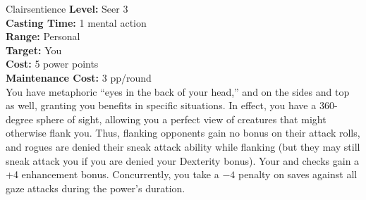 {Clairsentience}
{
	\textbf{Level:}
	Seer 3\\
	\textbf{Casting Time:}
	1 mental action\\
	\textbf{Range:}
	Personal\\
	\textbf{Target:}
	You\\
	\textbf{Cost:}
	5 power points\\
	\textbf{Maintenance Cost:}
	3 pp/round\\
}
{
	You have metaphoric ``eyes in the back of your head,'' and on the sides and top as well, granting you benefits in specific situations. In effect, you have a 360-degree sphere of sight, allowing you a perfect view of creatures that might otherwise flank you. Thus, flanking opponents gain no bonus on their attack rolls, and rogues are denied their sneak attack ability while flanking (but they may still sneak attack you if you are denied your Dexterity bonus). Your  and  checks gain a +4 enhancement bonus. Concurrently, you take a $-4$ penalty on saves against all gaze attacks during the power's duration. 
}
